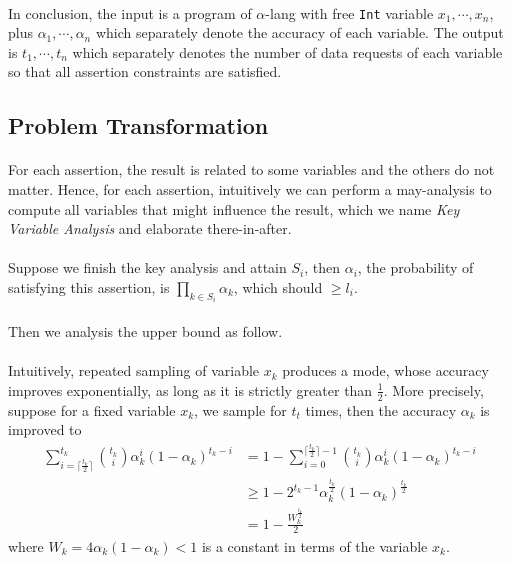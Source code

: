 \documentclass[a4paper]{article}
\begin{document}
\paragraph{}
In conclusion, the input is a program of $\alpha$-lang with free \texttt{Int} variable $x_1,\cdots,x_n$, plus $\alpha_1,\cdots,\alpha_n$ which separately denote the accuracy of each variable. The output is $t_1,\cdots,t_n$ which separately denotes the number of data requests of each variable so that all assertion constraints are satisfied.
\subsection{Problem Transformation}
\paragraph{}
For each assertion, the result is related to some variables and the others do not matter. Hence, for each assertion, intuitively we can perform a may-analysis to compute all variables that might influence the result, which we name \emph{Key Variable Analysis} and elaborate there-in-after.
\paragraph{}
Suppose we finish the key analysis and attain $S_i$, then $\alpha_i$, the probability of satisfying this assertion, is $\prod\limits_{k\in S_i}\alpha_k$, which should $\ge l_i$.
\paragraph{}
Then we analysis the upper bound as follow.
\paragraph{}
Intuitively, repeated sampling of variable $x_k$ produces a mode, whose accuracy improves exponentially, as long as it is strictly greater than $\frac{1}{2}$. More precisely, suppose for a fixed variable $x_k$, we sample for $t_t$ times, then the accuracy $\alpha_k$ is improved to
\begin{align*}
	\sum^{t_k}_{i=\lceil\frac{t_k}{2}\rceil}\binom{t_k}{i}{\alpha}^i_k(1-\alpha_k)^{t_k-i} &= 1-\sum^{\lceil\frac{t_k}{2}\rceil-1}_{i=0}\binom{t_k}{i}\alpha^i_k(1-\alpha_k)^{t_k-i}\\
	&\ge 1-2^{t_k-1}\alpha^{\frac{t_k}{2}}_k(1-\alpha_k)^{\frac{t_k}{2}}\\
	&= 1-\frac{W^{\frac{t_k}{2}}_k}{2}
\end{align*}
where $W_k=4\alpha_k(1-\alpha_k)<1$ is a constant in terms of the variable $x_k$.
\end{document}
